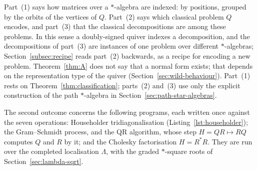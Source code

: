 \documentclass[12pt, a4paper]{report}
\theoremstyle{plain}
\theoremstyle{definition}
\theoremstyle{remark}
\theoremstyle{plain}
\newcommand{\staralg}[0]{$*$-algebra}
\newcommand{\staralgs}[0]{$*$-algebras}
\begin{document}
Part~(1) says how matrices over a \staralg{} are indexed: by positions, grouped by the orbits of the vertices of $Q$. Part~(2) says which classical problem $Q$ encodes, and part~(3) that the classical decompositions are among these problems. In this sense a doubly-signed quiver indexes a decomposition, and the decompositions of part~(3) are instances of one problem over different \staralgs{}; Section~\ref{subsec:recipe} reads part~(2) backwards, as a recipe for encoding a new problem. Theorem~\ref{thm:A} does not say that a normal form exists; that depends on the representation type of the quiver (Section~\ref{sec:wild-behaviour}). Part~(1) rests on Theorem~\ref{thm:classification}; parts~(2) and~(3) use only the explicit construction of the path $*$-algebra in Section~\ref{sec:path-star-algebras}.

The second outcome concerns the following programs, each written once against the seven operations: Householder tridiagonalisation (Listing~\ref{lst:householder}); the Gram--Schmidt process, and the QR algorithm, whose step $H=QR\mapsto RQ$ computes $Q$ and $R$ by it; and the Cholesky factorisation $H=R^*R$. They are run over the completed localisation $\Lambda$, with the graded $*$-square roots of Section~\ref{sec:lambda-sqrt}.
\end{document}

